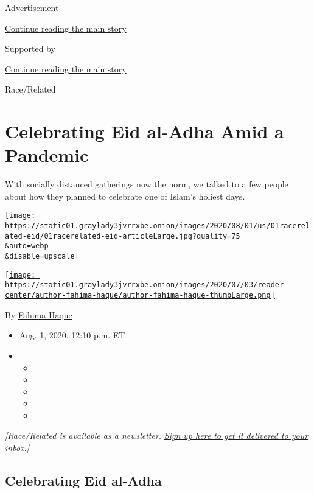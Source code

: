 Advertisement

\protect\hyperlink{after-top}{Continue reading the main story}

Supported by

\protect\hyperlink{after-sponsor}{Continue reading the main story}

Race/Related

\hypertarget{celebrating-eid-al-adha-amid-a-pandemic}{%
\section{Celebrating Eid al-Adha Amid a
Pandemic}\label{celebrating-eid-al-adha-amid-a-pandemic}}

With socially distanced gatherings now the norm, we talked to a few
people about how they planned to celebrate one of Islam's holiest days.

\texttt{[image: https://static01.graylady3jvrrxbe.onion/images/2020/08/01/us/01racerelated-eid/01racerelated-eid-articleLarge.jpg?quality=75\\\&auto=webp\\\&disable=upscale]}

\href{https://www.nytimes3xbfgragh.onion/by/fahima-haque}{\texttt{[image: https://static01.graylady3jvrrxbe.onion/images/2020/07/03/reader-center/author-fahima-haque/author-fahima-haque-thumbLarge.png]}}

By \href{https://www.nytimes3xbfgragh.onion/by/fahima-haque}{Fahima
Haque}

\begin{itemize}
\item
  Aug. 1, 2020, 12:10 p.m. ET
\item
  \begin{itemize}
  \item
  \item
  \item
  \item
  \item
  \end{itemize}
\end{itemize}

\emph{{[}Race/Related is available as a newsletter.}
\href{https://www.nytimes3xbfgragh.onion/newsletters/race-related}{\emph{Sign
up here to get it delivered to your inbox}}\emph{.{]}}

\hypertarget{celebrating-eid-al-adha}{%
\subsection{Celebrating Eid al-Adha}\label{celebrating-eid-al-adha}}

